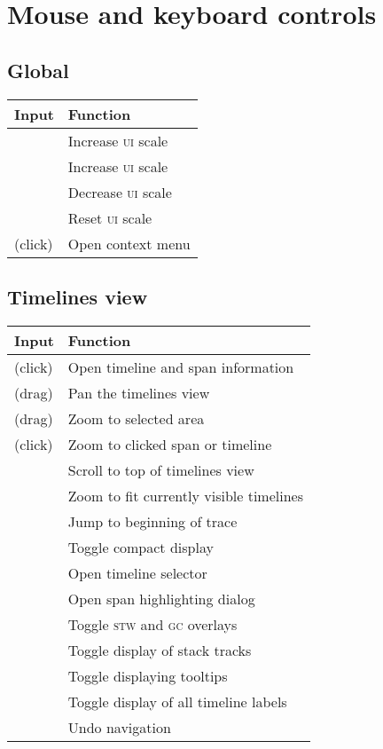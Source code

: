 \documentclass[10pt,letterpaper,oneside,openany,english]{memoir}
\newcommand{\shortcut}{\ctrl{} or \cmdmac}
\newenvironment{keybindings}{%
\begingroup
\def\arraystretch{1.5}%
\begin{tabular}{ll}
  Input & Function \\
  \hline
}{%
\end{tabular}
\endgroup
}
\begin{document}
\section{Mouse and keyboard controls}

\subsection*{Global}

\begin{keybindings}
  \keys{\shortcut + {+}} & Increase \textsc{ui} scale \\
  \keys{\shortcut + =} & Increase \textsc{ui} scale \\
  \keys{\shortcut + -} & Decrease \textsc{ui} scale \\
  \keys{\shortcut + 0} & Reset \textsc{ui} scale \\
  \keys{RMB} (click) & Open context menu
\end{keybindings}

\subsection*{Timelines view}

\begin{keybindings}
  \keys{LMB} (click) & Open timeline and span information \\
  \keys{LMB} (drag) & Pan the timelines view \\
  \keys{\shortcut + LMB} (drag) & Zoom to selected area \\
  \keys{\shortcut + LMB} (click) & Zoom to clicked span or timeline \\
  \keys{Home} & Scroll to top of timelines view \\
  \keys{\shortcut + Home} & Zoom to fit currently visible timelines \\
  \keys{\shift + Home} & Jump to beginning of trace \\
  \keys{C} & Toggle compact display \\
  \keys{G} & Open timeline selector \\
  \keys{H} & Open span highlighting dialog \\
  \keys{O} & Toggle \textsc{stw} and \textsc{gc} overlays \\
  \keys{S} & Toggle display of stack tracks \\
  \keys{T} & Toggle displaying tooltips \\
  \keys{X} & Toggle display of all timeline labels \\
  \keys{\shortcut + Z} &  Undo navigation
\end{keybindings}
\end{document}
